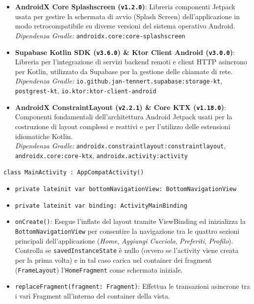 \documentclass[a4paper]{report}
\begin{document}
\begin{itemize}
    \vspace{0.3cm}
    \item \textbf{AndroidX Core Splashscreen (\texttt{v1.2.0})}: Libreria componenti Jetpack usata per gestire la schermata di avvio (Splash Screen) dell'applicazione in modo retrocompatibile su diverse versioni del sistema operativo Android. \\
    \textit{Dipendenza Gradle:} \texttt{androidx.core:\allowbreak core-splashscreen}

    \vspace{0.3cm}
    \item \textbf{Supabase Kotlin SDK (\texttt{v3.6.0}) \& Ktor Client Android (\texttt{v3.0.0})}: Libreria per l'integrazione di servizi backend remoti e client HTTP asincrono per Kotlin, utilizzato da Supabase per la gestione delle chiamate di rete. \\
    \textit{Dipendenza Gradle:} \texttt{io.github.jan-tennert.supabase:\allowbreak storage-kt}, \texttt{postgrest-kt}, \texttt{io.ktor:\allowbreak ktor-client-android}

    \vspace{0.3cm}
    \item \textbf{AndroidX ConstraintLayout (\texttt{v2.2.1}) \& Core KTX (\texttt{v1.18.0})}: Componenti fondamentali dell'architettura Android Jetpack usati per la costruzione di layout complessi e reattivi e per l'utilizzo delle estensioni idiomatiche Kotlin. \\
    \textit{Dipendenza Gradle:} \texttt{androidx.constraintlayout:\allowbreak constraintlayout}, \texttt{androidx.core:\allowbreak core-ktx}, \texttt{androidx.activity:\allowbreak activity}
\end{itemize}
\clearpage


\texttt{class MainActivity : AppCompatActivity()}
\begin{itemize}
    \item \texttt{private lateinit var bottomNavigationView: BottomNavigationView}
    \item \texttt{private lateinit var binding: ActivityMainBinding}
    \item \texttt{onCreate()}: Esegue l'inflate del layout tramite ViewBinding ed inizializza la \texttt{BottomNavigationView} per consentire la navigazione tra le quattro sezioni principali dell'applicazione (\textit{Home}, \textit{Aggiungi Cucciolo}, \textit{Preferiti}, \textit{Profilo}). Controlla se \texttt{savedInstanceState} è nullo (ovvero se l'activity viene creata per la prima volta) e in tal caso carica nel container dei fragment (\texttt{FrameLayout}) l'\texttt{HomeFragment} come schermata iniziale.
    \item \texttt{replaceFragment(fragment: Fragment)}: Effettua le transazioni asincrone tra i vari Fragment all'interno del container della vista.
\end{itemize}
\end{document}
